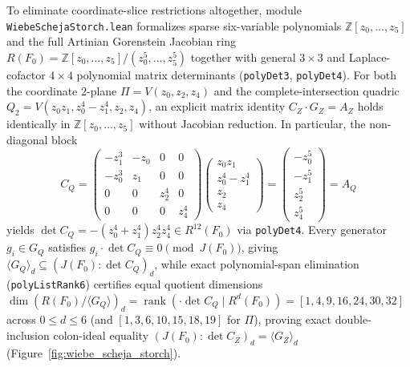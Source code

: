 \documentclass[11pt,a4paper]{article}
\begin{document}
To eliminate coordinate-slice restrictions altogether, module \texttt{WiebeSchejaStorch.lean} formalizes sparse six-variable polynomials $\mathbb{Z}[z_0, \dots, z_5]$ and the full Artinian Gorenstein Jacobian ring $R(F_0) = \mathbb{Z}[z_0,\dots,z_5]/(z_0^5,\dots,z_5^5)$ together with general $3 \times 3$ and Laplace-cofactor $4 \times 4$ polynomial matrix determinants (\texttt{polyDet3}, \texttt{polyDet4}). For both the coordinate $2$-plane $\Pi = V(z_0, z_2, z_4)$ and the complete-intersection quadric $Q_2 = V(z_0 z_1, z_0^4 - z_1^4, z_2, z_4)$, an explicit matrix identity $C_Z \cdot G_Z = A_Z$ holds identically in $\mathbb{Z}[z_0,\dots,z_5]$ without Jacobian reduction. In particular, the non-diagonal block
\begin{equation}
  C_Q = \begin{pmatrix} -z_1^3 & -z_0 & 0 & 0 \\ -z_0^3 & z_1 & 0 & 0 \\ 0 & 0 & z_2^4 & 0 \\ 0 & 0 & 0 & z_4^4 \end{pmatrix}
  \begin{pmatrix} z_0 z_1 \\ z_0^4 - z_1^4 \\ z_2 \\ z_4 \end{pmatrix}
  = \begin{pmatrix} -z_0^5 \\ -z_1^5 \\ z_2^5 \\ z_4^5 \end{pmatrix} = A_Q
\end{equation}
yields $\det C_Q = -(z_0^4 + z_1^4) z_2^4 z_4^4 \in R^{12}(F_0)$ via \texttt{polyDet4}. Every generator $g_i \in G_Q$ satisfies $g_i \cdot \det C_Q \equiv 0 \pmod{J(F_0)}$, giving $\langle G_Q \rangle_d \subseteq (J(F_0) : \det C_Q)_d$, while exact polynomial-span elimination (\texttt{polyListRank6}) certifies equal quotient dimensions $\dim (R(F_0)/\langle G_Q \rangle)_d = \operatorname{rank}(\cdot \det C_Q \mid R^d(F_0)) = [1, 4, 9, 16, 24, 30, 32]$ across $0 \le d \le 6$ (and $[1, 3, 6, 10, 15, 18, 19]$ for $\Pi$), proving exact double-inclusion colon-ideal equality $(J(F_0) : \det C_Z)_d = \langle G_Z \rangle_d$ (Figure~\ref{fig:wiebe_scheja_storch}).
\end{document}
